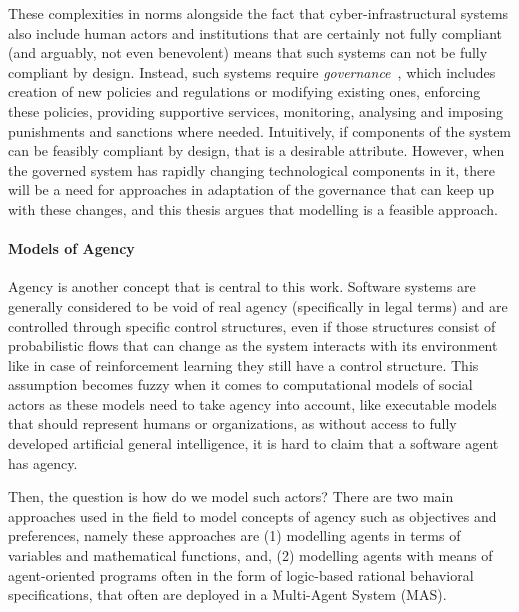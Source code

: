 
These complexities in norms alongside the fact that cyber-infrastructural systems also include human actors and institutions that are certainly not fully compliant (and arguably, not even benevolent) means that such systems can not be fully compliant by design. Instead, such systems require \textit{governance}~\cite{vanengers2010egoverment}, which includes creation of new policies and regulations or modifying existing ones, enforcing these policies, providing supportive services, monitoring, analysing and imposing punishments and sanctions where needed. Intuitively, if components of the system can be feasibly compliant by design, that is a desirable attribute. However, when the governed system has rapidly changing technological components in it, there will be a need for approaches in adaptation of the governance that can keep up with these changes, and this thesis argues that modelling is a feasible approach. 


\paragraph{Models of Agency}
Agency is another concept that is central to this work. Software systems are generally considered to be void of real agency (specifically in legal terms) and are controlled through specific control structures, even if those structures consist of probabilistic flows that can change as the system interacts with its environment like in case of reinforcement learning they still have a control structure. This assumption becomes fuzzy when it comes to computational models of social actors as these models need to take agency into account, like executable models that should represent humans or organizations, as without access to fully developed artificial general intelligence, it is hard to claim that a software agent has agency. 

Then, the question is how do we model such actors? There are two main approaches used in the field to model concepts of agency such as objectives and preferences, namely these approaches are (1) modelling agents in terms of variables and mathematical functions, and, (2) modelling agents with means of agent-oriented programs often in the form of logic-based rational behavioral specifications, that often are deployed in a Multi-Agent System (MAS).


